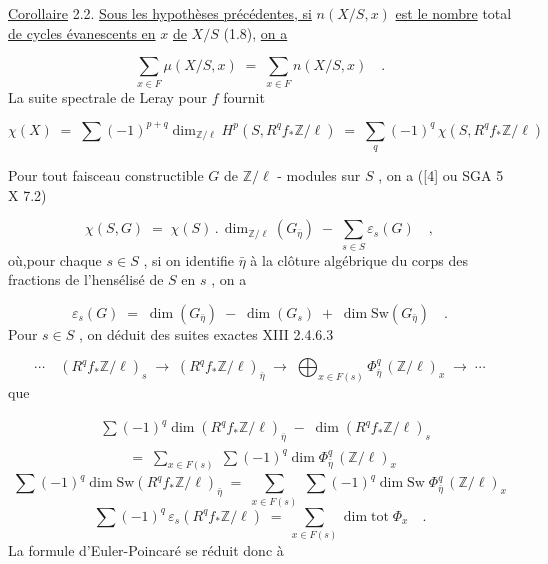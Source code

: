 \underline{Corollaire} 2.2. \quad \underline{Sous les hypothèses précédentes, si} $n(X/S,x)$ \underline{est le nombre} total \underline{de cycles évanescents en} $x$ \underline{de} $X/S$ (1.8), \underline{on a}

\begin{equation*}
\sum_{x \in F} \mu(X/S,x) \; = \; \sum_{x \in F} n(X/S,x) \quad .
\end{equation*}
La suite spectrale de Leray pour $f$ fournit

\begin{equation*}
\chi(X) \; = \; \sum (-1)^{p+q} \dim_{\mathbb{Z}/\ell} H^p(S,R^q f_* \mathbb{Z}/\ell) \; = \; \sum_q (-1)^q \, \chi(S,R^q f_* \mathbb{Z}/\ell)
\end{equation*}


Pour tout faisceau constructible $G$ de $\mathbb{Z}/\ell$ - modules sur $S$ , on a ([4] ou SGA 5 X 7.2)

\begin{equation*}
\chi(S,G) \; = \; \chi(S) \, . \, \dim_{\mathbb{Z}/\ell}(G_{\bar{\eta}}) \; - \; \sum_{s \in S} \varepsilon_s(G) \quad ,
\end{equation*}
où,pour chaque $s \in S$ , si on identifie $\bar{\eta}$ à la clôture algébrique du corps des fractions de l'hensélisé de $S$ en $s$ , on a

\begin{equation*}
\varepsilon_s(G) \; = \; \dim(G_{\bar{\eta}}) \; - \; \dim(G_s) \; + \; \dim \mathrm{Sw}(G_{\bar{\eta}}) \quad .
\end{equation*}
Pour $s \in S$ , on déduit des suites exactes XIII 2.4.6.3

\begin{equation*}
\cdots \quad (R^q f_* \mathbb{Z}/\ell)_s \; \longrightarrow \; (R^q f_* \mathbb{Z}/\ell)_{\bar{\eta}} \; \longrightarrow \; \bigoplus_{x \in F(s)} \Phi^q_{\bar{\eta}} \, (\mathbb{Z}/\ell)_x \; \longrightarrow \; \cdots
\end{equation*}
que

\begin{equation*}\tag{a}
\begin{aligned} &\sum (-1)^q \dim(R^q f_* \mathbb{Z}/\ell)_{\bar{\eta}} \; - \; \dim(R^q f_* \mathbb{Z}/\ell)_s \\[1ex] &\qquad = \; \sum_{x \in F(s)} \; \sum (-1)^q \dim \Phi^q_{\bar{\eta}} \, (\mathbb{Z}/\ell)_x \end{aligned}
\end{equation*}
\begin{equation*}\tag{b}
\sum (-1)^q \dim \mathrm{Sw}(R^q f_* \mathbb{Z}/\ell)_{\bar{\eta}} \; = \; \sum_{x \in F(s)} \; \sum (-1)^q \dim \mathrm{Sw} \; \Phi^q_{\bar{\eta}} \, (\mathbb{Z}/\ell)_x
\end{equation*}
\begin{equation}\tag{c}
\sum (-1)^q \, \varepsilon_s(R^q f_* \mathbb{Z}/\ell) \; = \; \sum_{x \in F(s)} \dim \mathrm{tot} \; \Phi_x \quad .
\end{equation}
La formule d'Euler-Poincaré se réduit donc à

